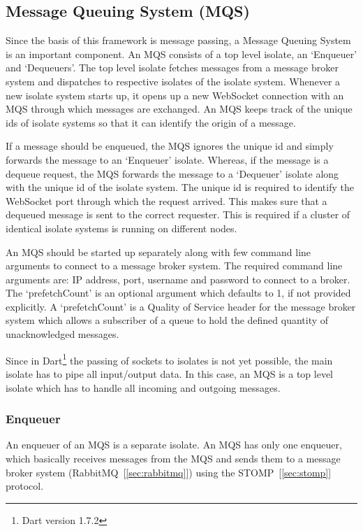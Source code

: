 \subsection{Message Queuing System (MQS)}
\label{subsec:mqs}
  Since the basis of this framework is message passing, a Message Queuing System is an important component. An MQS consists of a top level isolate, an ‘Enqueuer’ and ‘Dequeuers’. The top level isolate fetches messages from a message broker system and dispatches to respective isolates of the isolate system. Whenever a new isolate system starts up, it opens up a new WebSocket connection with an MQS through which messages are exchanged. An MQS keeps track of the unique ids of isolate systems so that it can identify the origin of a message.

  If a message should be enqueued, the MQS ignores the unique id and simply forwards the message to an ‘Enqueuer’ isolate. Whereas, if the message is a dequeue request, the MQS forwards the message to a ‘Dequeuer’ isolate along with the unique id of the isolate system. The unique id is required to identify the WebSocket port through which the request arrived. This makes sure that a dequeued message is sent to the correct requester. This is required if a cluster of identical isolate systems is running on different nodes.

  An MQS should be started up separately along with few command line arguments to connect to a message broker system. The required command line arguments are: IP address, port, username and password to connect to a broker. The ‘prefetchCount’ is an optional argument which defaults to 1, if not provided explicitly. A ‘prefetchCount’ is a Quality of Service header for the message broker system which allows a subscriber of a queue to hold the defined quantity of unacknowledged messages.

Since in Dart\footnote{Dart version 1.7.2} the passing of sockets to isolates is not yet possible, the main isolate has to pipe all input/output data. In this case, an MQS is a top level isolate which has to handle all incoming and outgoing messages.

  \subsubsection{Enqueuer}
  An enqueuer of an MQS is a separate isolate. An MQS has only one enqueuer, which basically receives messages from the MQS and sends them to a message broker system (RabbitMQ~[\ref{sec:rabbitmq}]) using the STOMP~[\ref{sec:stomp}] protocol.

